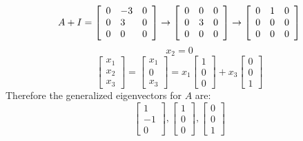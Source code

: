 \documentclass[12pt,letterpaper,reqno]{amsart}
\begin{document}
\begin{enumerate}
\begin{enumerate}
    $$A+I = \left[ \begin{array} { l l l } { 0 } & { -3 } & { 0 } \\ { 0 } & { 3 } & { 0 } \\ { 0 } & { 0 } & { 0 } \end{array} \right] \rightarrow \left[ \begin{array} { l l l } { 0 } & { 0 } & { 0 } \\ { 0 } & { 3 } & { 0 } \\ { 0 } & { 0 } & { 0 } \end{array} \right] \rightarrow \left[ \begin{array} { l l l } { 0 } & { 1 } & { 0 } \\ { 0 } & { 0 } & { 0 } \\ { 0 } & { 0 } & { 0 } \end{array} \right]$$
    $$x_2 = 0$$
    $$\left[ \begin{array} { l } { x_1 } \\ { x_2 } \\ { x_3 } \end{array} \right] = \left[ \begin{array} { l } { x_1 } \\ { 0 } \\ { x_3 } \end{array} \right] = x_1 \left[ \begin{array} { l } { 1 } \\ { 0 } \\ { 0 } \end{array} \right] + x_3 \left[ \begin{array} { l } { 0 } \\ { 0 } \\ { 1 } \end{array} \right]$$
    \newline
    Therefore the generalized eigenvectors for $A$ are:
    $$ \left[ \begin{array} { l } { 1 } \\ { -1 } \\ { 0 } \end{array} \right], \left[ \begin{array} { l } { 1 } \\ { 0 } \\ { 0 } \end{array} \right], \left[ \begin{array} { l } { 0 } \\ { 0 } \\ { 1 } \end{array} \right]$$
    

\end{enumerate}
\end{enumerate}
\end{document}
